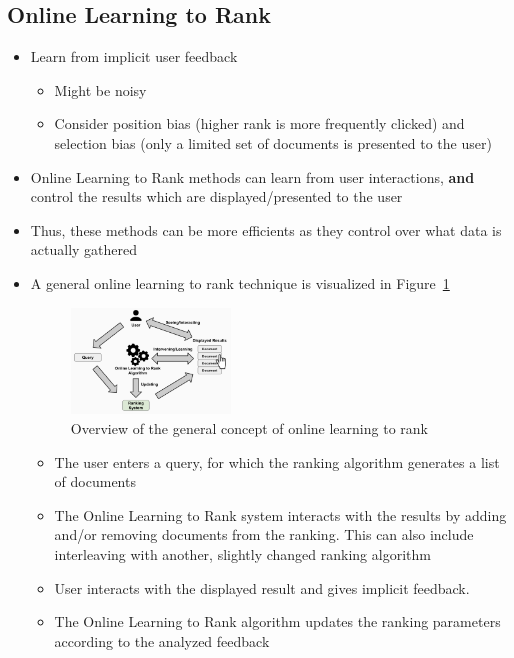 \subsection{Online Learning to Rank}
\begin{itemize}
	\item Learn from implicit user feedback
	\begin{itemize}
		\item Might be noisy
		\item Consider position bias (higher rank is more frequently clicked) and selection bias (only a limited set of documents is presented to the user)
	\end{itemize}
	\item Online Learning to Rank methods can learn from user interactions, \textbf{and} control the results which are displayed/presented to the user
	\item Thus, these methods can be more efficients as they control over what data is actually gathered
	\item A general online learning to rank technique is visualized in Figure~\ref{img:learning_to_rank_online_overview}
	\begin{figure}[ht]
		\centering
		\includegraphics[width=0.4\textwidth]{figures/learning_to_rank_online_overview.png}
		\caption{Overview of the general concept of online learning to rank}
		\label{img:learning_to_rank_online_overview}
	\end{figure}
	\begin{itemize}
		\item The user enters a query, for which the ranking algorithm generates a list of documents
		\item The Online Learning to Rank system interacts with the results by adding and/or removing documents from the ranking. This can also include interleaving with another, slightly changed ranking algorithm
		\item User interacts with the displayed result and gives implicit feedback.
		\item The Online Learning to Rank algorithm updates the ranking parameters according to the analyzed feedback

\end{itemize}
\end{itemize}
